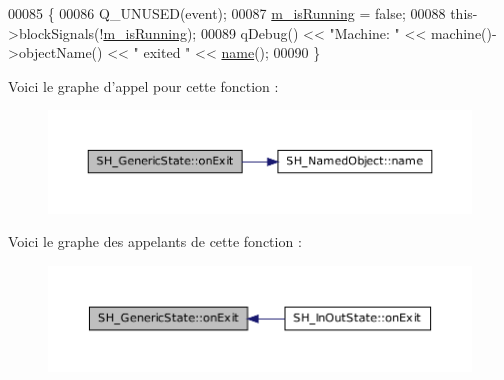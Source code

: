 \begin{DoxyCode}
00085 \{
00086     Q\_UNUSED(event);
00087     \hyperlink{classSH__GenericState_a72ddc905cfbffbed48bb2f2474d5297a}{m\_isRunning} = \textcolor{keyword}{false};
00088     this->blockSignals(!\hyperlink{classSH__GenericState_a72ddc905cfbffbed48bb2f2474d5297a}{m\_isRunning});
00089     qDebug() << \textcolor{stringliteral}{"Machine: "} << machine()->objectName() << \textcolor{stringliteral}{" exited  "} << \hyperlink{classSH__NamedObject_a9f686c6f2a5bcc08ad03d0cee0151f0f}{name}();
00090 \}
\end{DoxyCode}


Voici le graphe d'appel pour cette fonction \-:\nopagebreak
\begin{figure}[H]
\begin{center}
\leavevmode
\includegraphics[width=350pt]{classSH__GenericState_a7f7863859318c70c9b734be5bf5510b0_cgraph}
\end{center}
\end{figure}




Voici le graphe des appelants de cette fonction \-:\nopagebreak
\begin{figure}[H]
\begin{center}
\leavevmode
\includegraphics[width=350pt]{classSH__GenericState_a7f7863859318c70c9b734be5bf5510b0_icgraph}
\end{center}
\end{figure}


